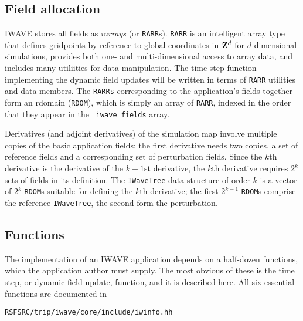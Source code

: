 \subsection{Field allocation}
IWAVE stores all fields as {\em
  rarrays} (or {\tt RARR}s). {\tt RARR} is an intelligent array type
that defines gridpoints by reference to global coordinates in ${\bf
  Z}^d$ for $d$-dimensional simulations, provides both one- and
multi-dimensional access to array data, and includes many utiliities
for data manipulation. The time step function implementing the dynamic
field updates will be written in terms of {\tt RARR} utilities and
data members. The {\tt RARRs} corresponding to the application's
fields together form an {\rm rdomain} ({\tt RDOM}), which is simply an
array of {\tt RARR}, indexed in the order that they appear in the {\tt
  iwave\_fields} array.

Derivatives (and adjoint derivatives) of the simulation map involve
multiple copies of the basic application fields: the first derivative
needs two copies, a set of reference fields and a corresponding set of
perturbation fields. Since the $k$th derivative is the derivative of
the $k-1$st derivative, the $k$th derivative
requires $2^k$ sets of fields in its definition. The {\tt IWaveTree}
data structure of order $k$ is a vector of $2^k$ {\tt RDOM}s suitable
for defining the $k$th derivative; the first $2^{k-1}$ {\tt RDOM}s
comprise the reference {\tt IWaveTree}, the second form the
perturbation. 

\subsection{Functions}
The implementation of an IWAVE application depends on a half-dozen
functions, which the application author must supply. The most obvious
of these is the time step, or dynamic field update, function, and it
is described here. All six essential functions are documented in 
\begin{verbatim}
RSFSRC/trip/iwave/core/include/iwinfo.hh
\end{verbatim}

